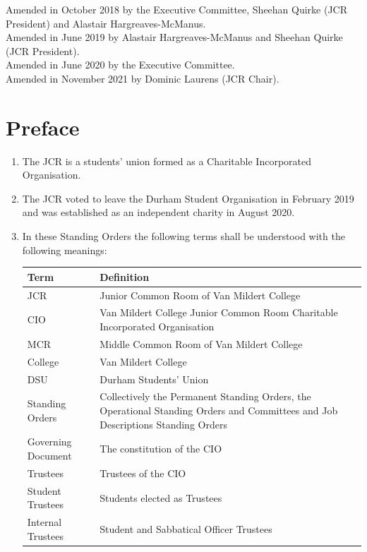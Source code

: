 \documentclass[12pt]{article}
\begin{document}
Amended in October 2018 by the Executive Committee, Sheehan Quirke (JCR President) and Alastair Hargreaves-McManus.\\
Amended in June 2019 by Alastair Hargreaves-McManus and Sheehan Quirke (JCR President).\\
Amended in June 2020 by the Executive Committee.\\
Amended in November 2021 by Dominic Laurens (JCR Chair).
\newpage
\tableofcontents{}
\newpage


\section{Preface}
\begin{enumerate}
    \item The JCR is a students' union formed as a Charitable Incorporated Organisation.
    \item The JCR voted to leave the Durham Student Organisation in February 2019 and was established as an independent charity in August 2020.
    \item In these Standing Orders the following terms shall be understood with the following meanings:\\
\begin{tabular}{|p{1.5in}|p{3.8in}|}\hline
    \textbf{Term}           & \textbf{Definition}\\ \hline
    JCR                     & Junior Common Room of Van Mildert College\\ \hline
    CIO						& Van Mildert College Junior Common Room  Charitable Incorporated Organisation\\\hline
    MCR                     & Middle Common Room of Van Mildert College\\\hline
    College                 & Van Mildert College\\ \hline
    DSU                     & Durham Students' Union\\ \hline
    Standing Orders         & Collectively the Permanent Standing Orders, the Operational Standing Orders and Committees and Job Descriptions Standing Orders \\ \hline
    Governing Document      & The constitution of the CIO\\\hline
    Trustees				& Trustees of the CIO\\\hline
    Student Trustees		& Students elected as Trustees\\\hline
    Internal Trustees		& Student and Sabbatical Officer Trustees\\\hline

\end{tabular}
\end{enumerate}
\end{document}
